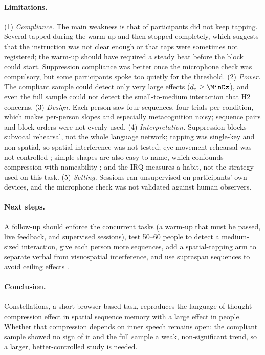 \documentclass[11pt,a4paper]{article}
\begin{document}
\paragraph{Limitations.} (1) \emph{Compliance.} The main weakness is that \NTapFail{} of \NAll{} participants did not keep
tapping. Several tapped during the warm-up and then stopped completely, which suggests that the instruction was not clear
enough or that taps were sometimes not registered; the warm-up should have required a steady beat before the block could
start. Suppression compliance was better once the microphone check was compulsory, but some participants spoke too quietly
for the threshold. (2) \emph{Power.} The compliant sample could detect only very large effects ($d_z \geq \MinDz$), and even the
full sample could not detect the small-to-medium interaction that H2 concerns. (3) \emph{Design.} Each person saw four
sequences, four trials per condition, which makes per-person slopes and especially metacognition noisy; sequence pairs and
block orders were not evenly used. (4) \emph{Interpretation.} Suppression blocks subvocal rehearsal, not the whole language
network; tapping was single-key and non-spatial, so spatial interference was not tested; eye-movement rehearsal was not
controlled \citep{desardenberg2024inter}; simple shapes are also easy to name, which confounds compression with nameability
\citep{seabra2025verbal}; and the IRQ measures a habit, not the strategy used on this task. (5) \emph{Setting.} Sessions ran
unsupervised on participants' own devices, and the microphone check was not validated against human observers.

\paragraph{Next steps.} A follow-up should enforce the concurrent tasks (a warm-up that must be passed, live feedback, and
supervised sessions), test 50--60 people to detect a medium-sized interaction, give each person more sequences, add a spatial-tapping
arm to separate verbal from visuospatial interference, and use supraspan sequences to avoid ceiling effects
\citep{tabbane2026humans}.

\paragraph{Conclusion.} Constellations, a short browser-based task, reproduces the language-of-thought compression effect in
spatial sequence memory with a large effect in \NAll{} people. Whether that compression depends on inner speech remains open:
the compliant sample showed no sign of it and the full sample a weak, non-significant trend, so a larger, better-controlled
study is needed.
\end{document}
